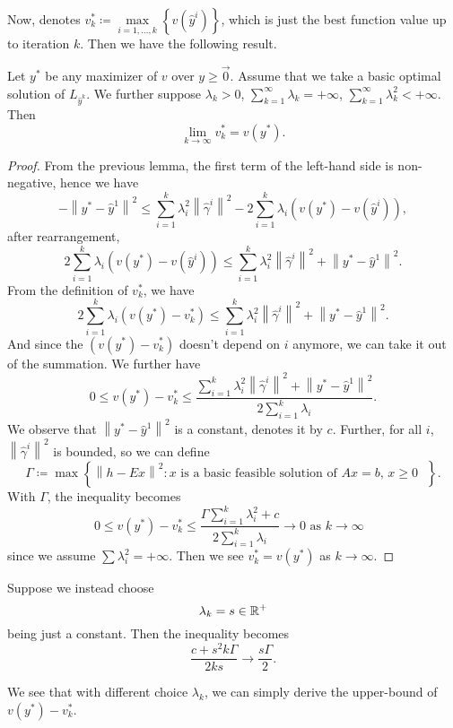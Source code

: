 Now, denotes \(v^{*}_{k}\coloneqq \max\limits_{i = 1, \ldots , k}\left\{v(\hat{y}^i)\right\}\), which is just the best function value
up to iteration \(k\). Then we have the following result.
\begin{theorem}
	Let \(y^{*}\) be any maximizer of \(v\) over \(y\geq \vec{0}\). Assume that we take a basic optimal solution of \(L_{\hat{y}^k}\). We
	further suppose \(\lambda_{k}>0\), \(\sum\limits_{k=1}^{\infty} \lambda_{k} = +\infty \), \(\sum\limits_{k=1}^{\infty} \lambda_{k}^2< +\infty\).
	Then
	\[
		\lim_{k \to \infty} v^{*}_k = v(y^{*}).
	\]
\end{theorem}
\begin{proof}
	From the previous lemma, the first term of the left-hand side is non-negative, hence we have
	\[
		- \left\lVert y^{*} - \hat{y}^1\right\rVert^2 \leq \sum\limits_{i=1}^{k} \lambda_{i}^{2}\left\lVert \hat{\gamma}^i\right\rVert^2 - 2 \sum\limits_{i=1}^{k} \lambda_{i}\left(v(y^{*}) - v(\hat{y}^i)\right),
	\]
	after rearrangement,
	\[
		2 \sum\limits_{i=1}^{k} \lambda_{i}\left(v(y^{*}) - v(\hat{y}^i)\right)\leq \sum\limits_{i=1}^{k} \lambda_{i}^{2}\left\lVert \hat{\gamma}^i\right\rVert^2 + \left\lVert y^{*} - \hat{y}^1\right\rVert^2.
	\]
	From the definition of \(v^{*}_{k}\), we have
	\[
		2 \sum\limits_{i=1}^{k} \lambda_{i}\left(v(y^{*}) - v^{*}_{k}\right)\leq \sum\limits_{i=1}^{k} \lambda_{i}^{2}\left\lVert \hat{\gamma}^i\right\rVert^2 + \left\lVert y^{*} - \hat{y}^1\right\rVert^2.
	\]
	And since the \(\left(v(y^{*}) - v^{*}_{k}\right)\) doesn't depend on \(i\) anymore, we can take it out of the summation. We further have
	\[
		0\leq v(y^{*}) - v^{*}_{k}\leq \frac{\sum\limits_{i=1}^{k} \lambda_{i}^{2}\left\lVert \hat{\gamma}^i\right\rVert^2 + \left\lVert y^{*} - \hat{y}^1\right\rVert^2}{2 \sum\limits_{i=1}^{k} \lambda_{i}}.
	\]
	We observe that \(\left\lVert y^{*} - \hat{y}^1\right\rVert^2 \) is a constant, denotes it by \(c\). Further, for all \(i\), \(\left\lVert \hat{\gamma}^i\right\rVert^2 \) is bounded, so we can define
	\[
		\Gamma\coloneqq \max\left\{\left\lVert h - Ex\right\rVert^2\colon \text{\(x\) is a basic feasible solution of \(Ax = b\), \(x\geq 0\)  }\right\}.
	\]
	With \(\Gamma\), the inequality becomes
	\[
		0\leq v(y^{*}) - v^{*}_{k}\leq \frac{\Gamma\sum\limits_{i=1}^{k} \lambda_{i}^{2} + c}{2 \sum\limits_{i=1}^{k} \lambda_{i}}\to 0 \text{ as \(k \to  \infty \) }
	\]
	since we assume \(\sum \lambda_{i}^2 = +\infty \). Then we see \(v^{*}_{k} = v(y^{*})\) as \(k \to \infty \).
\end{proof}
\begin{remark}
	Suppose we instead choose
	\[
		\lambda_{k} = s\in\mathbb{\MakeUppercase{R}}^+
	\]
	being just a constant. Then the inequality becomes
	\[
		\frac{c + s^2 k \Gamma }{2 k s}\to \frac{s \Gamma}{2}.
	\]

	We see that with different choice \(\lambda_{k}\), we can simply derive the upper-bound of \(v(y^{*}) - v^{*}_{k}\).
\end{remark}

